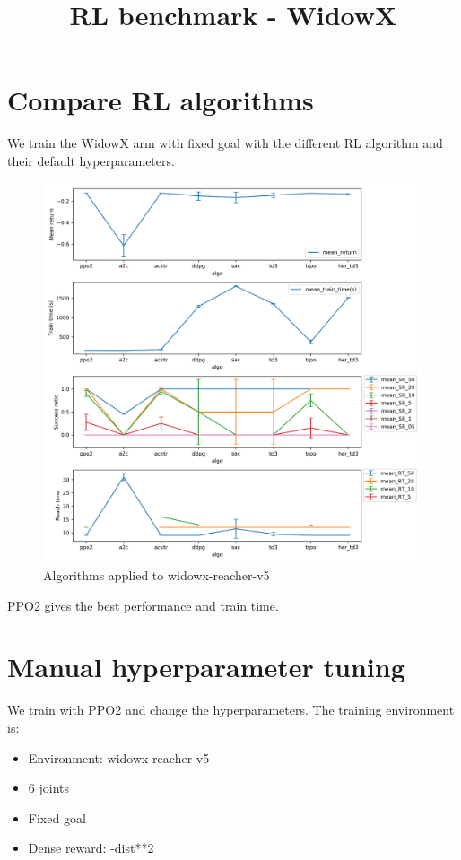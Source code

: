 \documentclass{article}
\title{RL benchmark - WidowX}
\date{}
\begin{document}
\maketitle



\section{Compare RL algorithms}

We train the WidowX arm with fixed goal with the different RL algorithm and their default hyperparameters.

\begin{figure}[H]
    \centering
    \includegraphics[width=\textwidth]{../algo.png}
\caption{Algorithms applied to widowx-reacher-v5}
\end{figure}

PPO2 gives the best performance and train time.


\section{Manual hyperparameter tuning}

We train with PPO2 and change the hyperparameters. The training environment is:

\begin{itemize}
  \item Environment: widowx-reacher-v5
  \item 6 joints
  \item Fixed goal
  \item Dense reward: -dist**2
\end{itemize}
\end{document}
